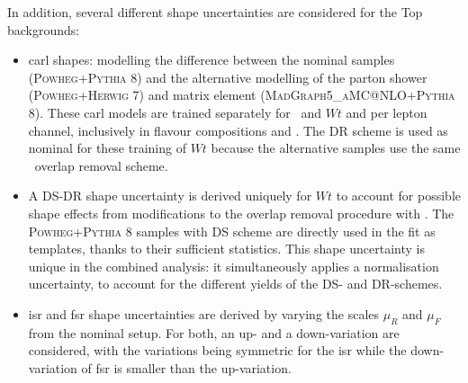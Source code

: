 In addition, several different shape uncertainties are considered for the Top backgrounds: 
\begin{itemize}
    \item \gls{carl} shapes: modelling the difference between the nominal samples (\textsc{Powheg}+\textsc{Pythia} 8) and the alternative modelling of the parton shower (\textsc{Powheg}+\textsc{Herwig} 7) and matrix element (\textsc{MadGraph5\_aMC@NLO}+\textsc{Pythia} 8). These \gls{carl} models are trained separately for \ttb\ and $Wt$ and per lepton channel, inclusively in flavour compositions and \nj. The DR scheme is used as nominal for these training of $Wt$ because the alternative samples use the same \ttb\ overlap removal scheme. 
    \item A DS-DR shape uncertainty is derived uniquely for $Wt$ to account for possible shape effects from modifications to the overlap removal procedure with \ttb. The \textsc{Powheg}+\textsc{Pythia} 8 samples with DS scheme are directly used in the fit as templates, thanks to their sufficient statistics. This shape uncertainty is unique in the combined analysis: it simultaneously applies a normalisation uncertainty, to account for the different yields of the DS- and DR-schemes.
    \item \gls{isr} and \gls{fsr} shape uncertainties are derived by varying the scales $\mu_R$ and $\mu_F$ from the nominal setup. For both, an up- and a down-variation are considered, with the variations being symmetric for the \gls{isr} while the down-variation of \gls{fsr} is smaller than the up-variation. %
\end{itemize} 

